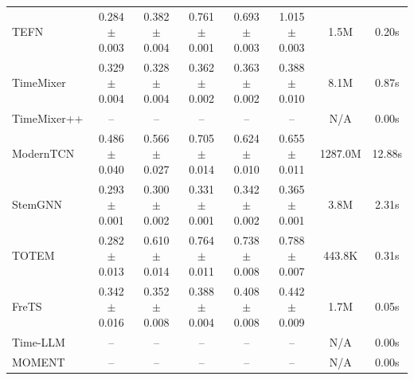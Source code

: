 \begin{table}[h]
\begin{footnotesize}
\begin{tabular}{l|ccccc|cc}
        TEFN & 0.284$\pm$0.003 & 0.382$\pm$0.004 & 0.761$\pm$0.001 & 0.693$\pm$0.003 & 1.015$\pm$0.003 & 1.5M & 0.20s \\
        TimeMixer & 0.329$\pm$0.004 & 0.328$\pm$0.004 & 0.362$\pm$0.002 & 0.363$\pm$0.002 & 0.388$\pm$0.010 & 8.1M & 0.87s \\
        TimeMixer++ & -- & -- & -- & -- & -- & N/A & 0.00s \\
        ModernTCN & 0.486$\pm$0.040 & 0.566$\pm$0.027 & 0.705$\pm$0.014 & 0.624$\pm$0.010 & 0.655$\pm$0.011 & 1287.0M & 12.88s \\
        StemGNN & 0.293$\pm$0.001 & 0.300$\pm$0.002 & 0.331$\pm$0.001 & 0.342$\pm$0.002 & 0.365$\pm$0.001 & 3.8M & 2.31s \\
        TOTEM & 0.282$\pm$0.013 & 0.610$\pm$0.014 & 0.764$\pm$0.011 & 0.738$\pm$0.008 & 0.788$\pm$0.007 & 443.8K & 0.31s \\
        FreTS & 0.342$\pm$0.016 & 0.352$\pm$0.008 & 0.388$\pm$0.004 & 0.408$\pm$0.008 & 0.442$\pm$0.009 & 1.7M & 0.05s \\
        Time-LLM & -- & -- & -- & -- & -- & N/A & 0.00s \\
        MOMENT & -- & -- & -- & -- & -- & N/A & 0.00s \\
        \bottomrule
    \end{tabular}
    \end{footnotesize}
\end{table}